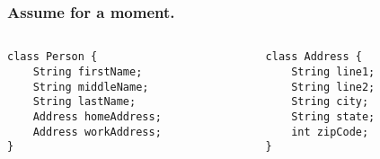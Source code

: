 \documentclass{beamer}
\begin{document}
    \lstset{language=Java}
    \begin{frame}[fragile=singleslide]
        \frametitle{Assume for a moment.}

        \begin{columns}[c]
            \begin{column}[T]{5cm}
                \begin{lstlisting}
class Person {
    String firstName;
    String middleName;
    String lastName;
    Address homeAddress;
    Address workAddress;
}
                \end{lstlisting}
            \end{column}
            \begin{column}[T]{5cm}
                \begin{lstlisting}
class Address {
    String line1;
    String line2;
    String city;
    String state;
    int zipCode;
}
                \end{lstlisting}
            \end{column}
        \end{columns}    
    \end{frame}
\end{document}
